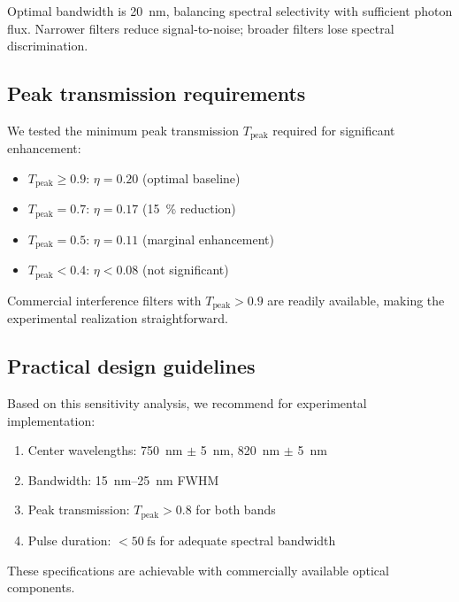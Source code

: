 \documentclass[11pt,a4paper]{article}
\begin{document}
Optimal bandwidth is \SI{20}{\nano\meter}, balancing spectral selectivity with sufficient photon flux. Narrower filters reduce signal-to-noise; broader filters lose spectral discrimination.

\subsection{Peak transmission requirements}

We tested the minimum peak transmission $T_{\mathrm{peak}}$ required for significant enhancement:
\begin{itemize}
    \item $T_{\mathrm{peak}} \geq 0.9$: $\eta = 0.20$ (optimal baseline)
    \item $T_{\mathrm{peak}} = 0.7$: $\eta = 0.17$ (\SI{15}{\percent} reduction)
    \item $T_{\mathrm{peak}} = 0.5$: $\eta = 0.11$ (marginal enhancement)
    \item $T_{\mathrm{peak}} < 0.4$: $\eta < 0.08$ (not significant)
\end{itemize}

Commercial interference filters with $T_{\mathrm{peak}} > 0.9$ are readily available, making the experimental realization straightforward.

\subsection{Practical design guidelines}

Based on this sensitivity analysis, we recommend for experimental implementation:
\begin{enumerate}
    \item Center wavelengths: \SI{750}{\nano\meter} $\pm$ \SI{5}{\nano\meter}, \SI{820}{\nano\meter} $\pm$ \SI{5}{\nano\meter}
    \item Bandwidth: \SIrange{15}{25}{\nano\meter} FWHM
    \item Peak transmission: $T_{\mathrm{peak}} > 0.8$ for both bands
    \item Pulse duration: $< \SI{50}{\femto\second}$ for adequate spectral bandwidth
\end{enumerate}

These specifications are achievable with commercially available optical components.

\end{document}
